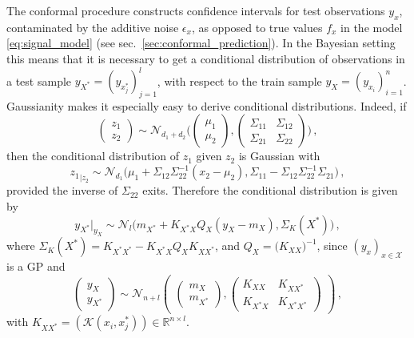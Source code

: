 \documentclass[a4paper,14pt]{extarticle}
\newcommand{\Ncal}{\mathcal{N}}
\newcommand{\Kcal}{\mathcal{K}}
\newcommand{\Xcal}{\mathcal{X}}
\newcommand{\Real}{\mathbb{R}}
\begin{document}
The conformal procedure constructs confidence intervals for test observations $y_x$,
contaminated by the additive noise $\epsilon_x$, as opposed to true values $f_x$ in
the model \ref{eq:signal_model} (see sec.~\ref{sec:conformal_prediction}). In the
Bayesian setting this means that it is necessary to get a conditional distribution
of observations in a test sample $y_{X^*} = (y_{x^*_j})_{j=1}^l$, with respect to
the train sample $y_X = (y_{x_i})_{i=1}^n$. Gaussianity makes it especially easy
to derive conditional distributions. Indeed, if
\begin{equation*}
  \begin{pmatrix}z_1 \\ z_2\end{pmatrix}
    \sim \Ncal_{d_1+d_2}\Biggl(
      \begin{pmatrix} \mu_1 \\ \mu_2 \end{pmatrix},
      \begin{pmatrix}
        \Sigma_{11} & \Sigma_{12} \\
        \Sigma_{21} & \Sigma_{22}
      \end{pmatrix}
    \Biggr)
    \,,
\end{equation*}
then the conditional distribution of $z_1$ given $z_2$ is Gaussian with
\begin{equation*}
  {z_1}_{|z_2}
    \sim \Ncal_{d_1}\bigl(
      \mu_1 + \Sigma_{12}\Sigma_{22}^{-1}(x_2-\mu_2),
      \Sigma_{11} - \Sigma_{12}\Sigma_{22}^{-1}\Sigma_{21}
    \bigr)
    \,,
\end{equation*}
provided the inverse of $\Sigma_{22}$ exits. Therefore the conditional distribution
is given by
\begin{equation} \label{eq:cond_distr}
  y_{X^*}\vert_{y_X}
    \sim \Ncal_l\bigl(
      m_{X^*} + K_{X^*X} Q_X (y_X - m_X),
      \Sigma_K(X^*)
    \bigr)
    \,,
\end{equation}
where $\Sigma_K(X^*) = K_{X^*X^*} - K_{X^*X} Q_X K_{XX^*}$, and
$Q_X = \bigl(K_{XX}\bigr)^{-1}$, since $(y_x)_{x\in\Xcal}$ is a GP and
\begin{equation*}
  \begin{pmatrix} y_X \\ y_{X^*} \end{pmatrix}
    \sim \Ncal_{n+l}\begin{pmatrix}
      \begin{pmatrix} m_X \\ m_{X^*} \end{pmatrix},
      \begin{pmatrix}
        K_{XX} & K_{XX^*} \\
        K_{X^*X} & K_{X^*X^*}
      \end{pmatrix}
    \end{pmatrix}
    \,,
\end{equation*}
with $K_{XX^*} = (\Kcal(x_i, x^*_j))\in \Real^{n\times l}$.
\end{document}
